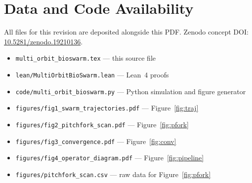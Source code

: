 \documentclass[12pt,a4paper]{article}
\begin{document}
\section*{Data and Code Availability}

All files for this revision are deposited alongside this PDF.
Zenodo concept DOI: \href{https://doi.org/10.5281/zenodo.19210136}{10.5281/zenodo.19210136}.


\begin{itemize}[leftmargin=2em, itemsep=1pt]
  \item \texttt{multi\_orbit\_bioswarm.tex} --- this source file
  \item \texttt{lean/MultiOrbitBioSwarm.lean} --- Lean~4 proofs
  \item \texttt{code/multi\_orbit\_bioswarm.py} --- Python simulation
    and figure generator
  \item \texttt{figures/fig1\_swarm\_trajectories.pdf} --- Figure~\ref{fig:traj}
  \item \texttt{figures/fig2\_pitchfork\_scan.pdf} --- Figure~\ref{fig:pfork}
  \item \texttt{figures/fig3\_convergence.pdf} --- Figure~\ref{fig:conv}
  \item \texttt{figures/fig4\_operator\_diagram.pdf} --- Figure~\ref{fig:pipeline}
  \item \texttt{figures/pitchfork\_scan.csv} --- raw data for Figure~\ref{fig:pfork}
\end{itemize}
\end{document}
